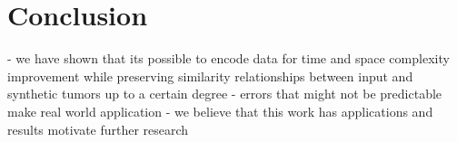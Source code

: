 
\chapter{Conclusion}\label{chapter:conclusion}

- we have shown that its possible to encode data for time and space complexity improvement while preserving similarity relationships between input and synthetic tumors up to a certain degree \newline
- errors that might not be predictable make real world application \newline
- we believe that this work has applications and results motivate further research
